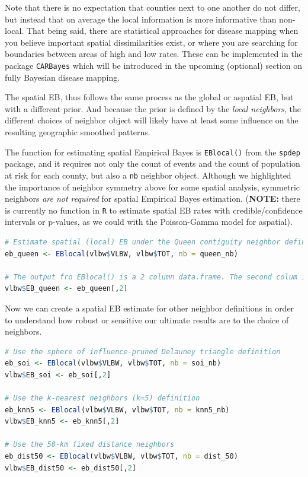 \documentclass[
]{book}
\newcommand{\passthrough}[1]{#1}
\begin{document}
Note that there is no expectation that counties next to one another do not differ, but instead that on average the local information is more informative than non-local. That being said, there are statistical approaches for disease mapping when you believe important spatial dissimilarities exist, or where you are searching for boundaries between areas of high and low rates. These can be implemented in the package \passthrough{\lstinline!CARBayes!} which will be introduced in the upcoming (optional) section on fully Bayesian disease mapping.

The spatial EB, thus follows the same process as the global or aspatial EB, but with a different prior. And because the prior is defined by the \emph{local neighbors}, the different choices of neighbor object will likely have at least some influence on the resulting geographic smoothed patterns.

The function for estimating spatial Empirical Bayes is \passthrough{\lstinline!EBlocal()!} from the \passthrough{\lstinline!spdep!} package, and it requires not only the count of events and the count of population at risk for each county, but also a \passthrough{\lstinline!nb!} neighbor object. Although we highlighted the importance of neighbor symmetry above for some spatial analysis, symmetric neighbors \emph{are not required} for spatial Empirical Bayes estimation. (\textbf{NOTE:} there is currently no function in \passthrough{\lstinline!R!} to estimate spatial EB rates with credible/confidence intervals or p-values, as we could with the Poisson-Gamma model for aspatial).

\begin{lstlisting}[language=R]
# Estimate spatial (local) EB under the Queen contiguity neighbor definition
eb_queen <- EBlocal(vlbw$VLBW, vlbw$TOT, nb = queen_nb)

# The output fro EBlocal() is a 2 column data.frame. The second colum is the EB estimate
vlbw$EB_queen <- eb_queen[,2]
\end{lstlisting}

Now we can create a spatial EB estimate for other neighbor definitions in order to understand how robust or sensitive our ultimate results are to the choice of neighbors.

\begin{lstlisting}[language=R]
# Use the sphere of influence-pruned Delauney triangle definition
eb_soi <- EBlocal(vlbw$VLBW, vlbw$TOT, nb = soi_nb)
vlbw$EB_soi <- eb_soi[,2]

# Use the k-nearest neighbors (k=5) definition
eb_knn5 <- EBlocal(vlbw$VLBW, vlbw$TOT, nb = knn5_nb)
vlbw$EB_knn5 <- eb_knn5[,2]

# Use the 50-km fixed distance neighbors
eb_dist50 <- EBlocal(vlbw$VLBW, vlbw$TOT, nb = dist_50)
vlbw$EB_dist50 <- eb_dist50[,2]
\end{lstlisting}
\end{document}
